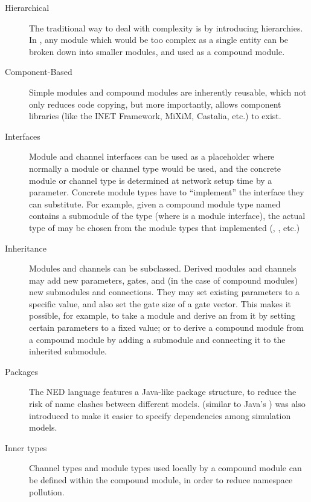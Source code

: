 \begin{description}

\item[Hierarchical] The traditional way to deal with complexity is by
introducing hierarchies. In {\opp}, any module which would be too complex as
a single entity can be broken down into smaller modules, and used as a
compound module.

\item[Component-Based] Simple modules and compound modules are inherently
reusable, which not only reduces code copying, but more importantly, allows
component libraries (like the INET Framework, MiXiM, Castalia, etc.) to
exist.

\item[Interfaces] Module and channel interfaces can be used as a
placeholder where normally a module or channel type would be used, and the
concrete module or channel type is determined at network setup time by a
parameter. Concrete module types have to ``implement'' the interface they
can substitute. For example, given a compound module type named
 contains a  submodule of the type
 (where  is a module interface), the actual
type of  may be chosen from the module types that implemented
 (, , etc.)

\item[Inheritance] Modules and channels can be subclassed. Derived modules
and channels may add new parameters, gates, and (in the case of compound
modules) new submodules and connections. They may set existing parameters
to a specific value, and also set the gate size of a gate vector. This
makes it possible, for example, to take a  module
and derive an  from it by setting certain parameters to a fixed
value; or to derive a  compound module from a
 compound module by adding a  submodule and
connecting it to the inherited  submodule.

\item[Packages] The NED language features a Java-like package structure,
to reduce the risk of name clashes between different models. 
(similar to Java's ) was also introduced to make it easier
to specify dependencies among simulation models.

\item[Inner types] Channel types and module types used locally by a
compound module can be defined within the compound module, in order to
reduce namespace pollution.


\end{description}
